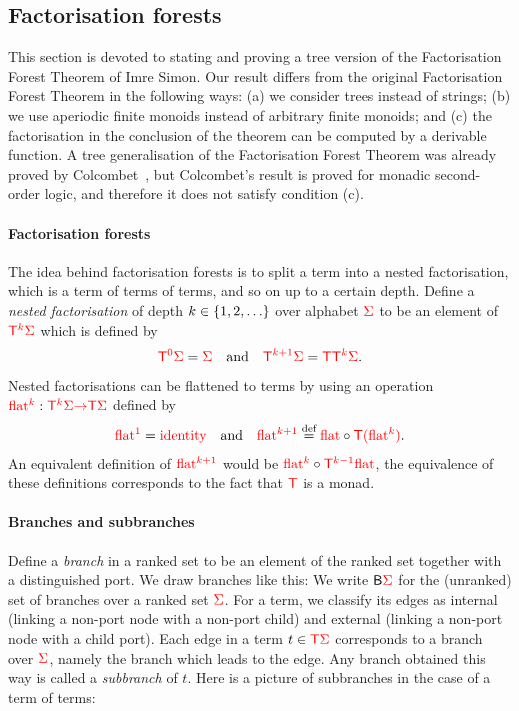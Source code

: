 \subsection{Factorisation forests}
\label{sec:factfor}
This section is devoted to stating and proving a tree version of the Factorisation Forest Theorem of Imre Simon.  Our result differs from the original Factorisation Forest Theorem in the following ways: (a) we consider trees instead of strings; (b) we use aperiodic finite monoids instead of arbitrary finite monoids; and (c) the factorisation in the conclusion of the theorem can be computed by a derivable function.  A tree generalisation of the Factorisation Forest Theorem was already proved by Colcombet~\cite[Theorem 1 and Section 3.3]{colcombetCombinatorialTheoremTrees2007}, but Colcombet's result is proved for monadic second-order logic, and therefore it does not satisfy condition (c). 



\paragraph{Factorisation forests} The idea behind factorisation forests is to split a term into a nested factorisation, which is a term of terms of terms, and so on up to a certain depth.  
Define a \emph{nested factorisation} of depth $k \in \{1,2,\ldots\}$ over alphabet ${\color{red}{\Sigma}}$ to be an element of ${\color{red}{\mathsf T}}^{{\color{red}{k}}} {\color{red}{\Sigma}}$ which is defined by
\begin{align*}
{\color{red}{\mathsf T}}^{{\color{red}{0}}} {\color{red}{\Sigma}} = {\color{red}{\Sigma}}  \quad \text{and} \quad {\color{red}{\mathsf T}}^{{\color{red}{k+1}}}{\color{red}{\Sigma}} = {\color{red}{\mathsf T}} {\color{red}{\mathsf T}}^{{\color{red}{k}}} {\color{red}{\Sigma}}.
\end{align*}
Nested factorisations can be flattened to terms by using an  operation ${\color{red}{\mathrm{flat}}}^{{\color{red}{k}}} : {\color{red}{\mathsf T}}^{{\color{red}{k}}} {\color{red}{\Sigma}} {\color{red}{\to}} {\color{red}{\mathsf T}} {\color{red}{\Sigma}} $ defined by 
\begin{align*}
     {\color{red}{\mathrm{flat}}}^{{\color{red}{1}}} = \text{{\color{red}{identity}}} \quad \text{and} \quad  {\color{red}{\mathrm{flat}}}^{{\color{red}{k+1}}} \stackrel{\text{def}}= {\color{red}{\mathrm{flat}}}  \circ {\color{red}{\mathsf T}} {\color{red}{(}} {\color{red}{\mathrm{flat}}}^{{\color{red}{k}}}{\color{red}{)}}.
\end{align*}
An equivalent definition of ${\color{red}{\mathrm{flat}}}^{{\color{red}{k+1}}}$ would be ${\color{red}{\mathrm{flat}}}^{{\color{red}{k}}} \circ {\color{red}{\mathsf T}}^{{\color{red}{k-1}}} {\color{red}{\mathrm{flat}}}$, the equivalence of these definitions corresponds to the fact that ${\color{red}{\mathsf T}}$ is a monad.


\paragraph{Branches and subbranches}
Define a \emph{branch} in a ranked set to be an element  of the ranked set together with a distinguished port. 
We draw branches like  this:
We write $\mathsf{B} {\color{red}{\Sigma}}$ for the (unranked) set of branches over a ranked set ${\color{red}{\Sigma}}$. \label{page:branches}
For a term, we classify its edges as internal (linking a non-port node with a non-port child) and external (linking a non-port node with a child port). Each edge in a term $t \in {\color{red}{\mathsf T}} {\color{red}{\Sigma}}$ corresponds to a branch over ${\color{red}{\Sigma}}$, namely the branch which leads to the edge. Any branch obtained this way is called a \emph{subbranch} of $t$. Here is a picture of subbranches in the case of a term of terms:

